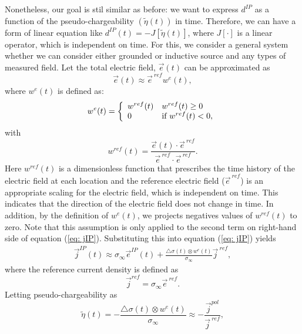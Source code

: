 \documentclass[a4paper, 11pt]{article}
\newcommand{\siginf}{\sigma_\infty}
\newcommand{\dsig}{\triangle\sigma}
\renewcommand {\j}  { {\vec j} }
\newcommand {\e}  { {\vec e} }
\newcommand{\peta}{\tilde{\eta}}
\newcommand{\dip}{d^{IP}}
\begin{document}
Nonetheless, our goal is stil similar as before: we want to express $\dip$ as a function of the pseudo-chargeability $(\peta(t))$ in time. Therefore, we can have a form of linear equation like $\dip(t) = -J[\peta(t)]$, where $J[\cdot]$ is a linear operator, which is independent on time. For this, we consider a general system whether we can consider either grounded or inductive source and any types of measured field. Let the total electric field, $\e(t)$ can be approximated as
\begin{equation}
  \e(t) \approx \e^{\ ref}w^e(t),
  \label{eq: e_with_eref}
\end{equation}
where $w^e(t)$ is defined as:
\begin{equation}
  w^e(t) = \left\{ 
  \begin{array}{l l}
    w^{ref}(t) & w^{ref}(t) \ge 0 \\
    0 & \text{if } w^{ref}(t) < 0, 
  \end{array}\right.
  \label{eq: we}
\end{equation}
with
\begin{equation}
  w^{ref}(t) = \frac{\e(t)\cdot\e^{\ ref}}{\e^{\ ref}\cdot\e^{\ ref}}.
\end{equation}
Here $w^{ref}(t)$ is a dimensionless function that prescribes the time history of the electric field at each location and the reference electric field ($\e^{\ ref}$) is an appropriate scaling for the electric field, which is independent on time. 
This indicates that the direction of the electric field does not change in time. 
In addition, by the definition of $w^e(t)$, we projects negatives values of  $w^{ref}(t)$ to zero.
Note that this assumption is only applied to the second term on right-hand side of equation (\ref{eq: jIP}). 
Substituting this into equation (\ref{eq: jIP}) yields
\begin{eqnarray*}
  \j^{IP}(t) \approx \siginf\e^{IP}(t) + \frac{\dsig(t)\otimes w^e(t)}{\siginf}\j^{\ ref},
\end{eqnarray*}
where the reference current density is defined as
\begin{equation}
  \j^{ref} = \siginf\e^{\ ref}.
\end{equation}
Letting pseudo-chargeability as
\begin{equation}
    \peta(t) = -\frac{\dsig(t)\otimes w^e(t)}{\siginf} \approx -\frac{\j^{pol}}{\j^{\ ref}},
    \label{eq: pseudochargeability}
\end{equation}
\end{document}
